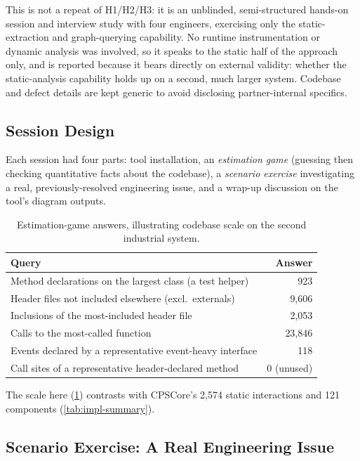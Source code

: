 This is not a repeat of H1/H2/H3: it is an unblinded, semi-structured
hands-on session and interview study with four engineers, exercising
only the static-extraction and graph-querying capability. No runtime
instrumentation or dynamic analysis was involved, so it speaks to the
static half of the approach only, and is reported because it bears
directly on external validity: whether the static-analysis capability
holds up on a second, much larger system. Codebase and defect details
are kept generic to avoid disclosing partner-internal specifics.

\subsection{Session Design}

Each session had four parts: tool installation, an \emph{estimation
game} (guessing then checking quantitative facts about the codebase), a
\emph{scenario exercise} investigating a real, previously-resolved
engineering issue, and a wrap-up discussion on the tool's diagram
outputs.

\begin{table}[htb]
\centering
\caption{Estimation-game answers, illustrating codebase scale on the
  second industrial system.}
\label{tab:renaissance-scale}
\begin{tabular}{@{} l r @{}}
\toprule
\textbf{Query} & \textbf{Answer} \\
\midrule
Method declarations on the largest class (a test helper) & 923 \\
Header files not included elsewhere (excl.\ externals)   & 9,606 \\
Inclusions of the most-included header file              & 2,053 \\
Calls to the most-called function                         & 23,846 \\
Events declared by a representative event-heavy interface & 118 \\
Call sites of a representative header-declared method      & 0 (unused) \\
\bottomrule
\end{tabular}
\end{table}

The scale here (\cref{tab:renaissance-scale}) contrasts with CPSCore's
2,574 static interactions and 121 components (\cref{tab:impl-summary}).

\subsection{Scenario Exercise: A Real Engineering Issue}\label{sec:scenario-exercise}

